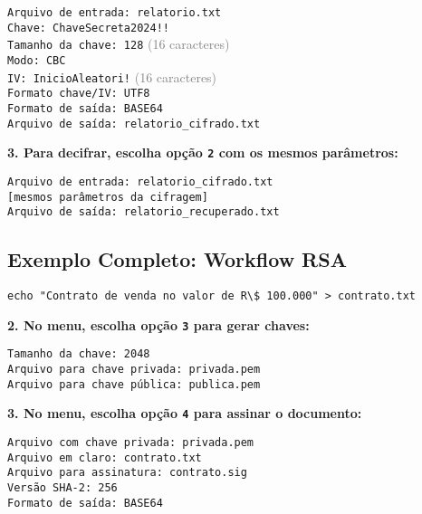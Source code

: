 \documentclass[12pt,a4paper]{article}
\begin{document}
\begin{tcolorbox}[colback=codebg,colframe=gray!50]
\footnotesize
\texttt{Arquivo de entrada: relatorio.txt}\\
\texttt{Chave: ChaveSecreta2024!!}\\
\texttt{Tamanho da chave: 128} \textcolor{gray}{(16 caracteres)}\\
\texttt{Modo: CBC}\\
\texttt{IV: InicioAleatori!} \textcolor{gray}{(16 caracteres)}\\
\texttt{Formato chave/IV: UTF8}\\
\texttt{Formato de saída: BASE64}\\
\texttt{Arquivo de saída: relatorio\_cifrado.txt}
\end{tcolorbox}

\textbf{3. Para decifrar, escolha opção \texttt{2} com os mesmos parâmetros:}

\begin{tcolorbox}[colback=codebg,colframe=gray!50]
\footnotesize
\texttt{Arquivo de entrada: relatorio\_cifrado.txt}\\
\texttt{[mesmos parâmetros da cifragem]}\\
\texttt{Arquivo de saída: relatorio\_recuperado.txt}
\end{tcolorbox}

\subsection{Exemplo Completo: Workflow RSA}

\begin{lstlisting}[style=bashstyle,caption={1. Preparar documento}]
echo "Contrato de venda no valor de R\$ 100.000" > contrato.txt
\end{lstlisting}

\textbf{2. No menu, escolha opção \texttt{3} para gerar chaves:}

\begin{tcolorbox}[colback=codebg,colframe=gray!50]
\footnotesize
\texttt{Tamanho da chave: 2048}\\
\texttt{Arquivo para chave privada: privada.pem}\\
\texttt{Arquivo para chave pública: publica.pem}
\end{tcolorbox}

\textbf{3. No menu, escolha opção \texttt{4} para assinar o documento:}

\begin{tcolorbox}[colback=codebg,colframe=gray!50]
\footnotesize
\texttt{Arquivo com chave privada: privada.pem}\\
\texttt{Arquivo em claro: contrato.txt}\\
\texttt{Arquivo para assinatura: contrato.sig}\\
\texttt{Versão SHA-2: 256}\\
\texttt{Formato de saída: BASE64}
\end{tcolorbox}
\end{document}
